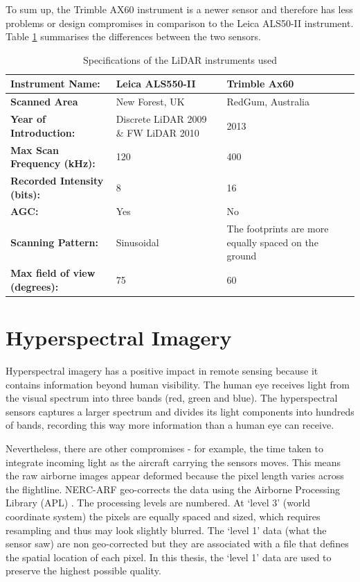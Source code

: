 \documentclass{subfiles}
\begin{document}
	To sum up, the Trimble AX60 instrument is a newer sensor and therefore has less problems or design compromises in comparison to the Leica ALS50-II instrument. Table \ref{tab:InstrumentsSpecs} summarises the differences between the two sensors. 
	
	\begin{table}[!htbp]
		\label{tab:InstrumentsSpecs}%
		\centering
		\begin{tabular}{|l||m{}|m{}|}
			\hline
			\textbf{Instrument Name:}	& \textbf{Leica ALS550-II}     & \textbf{Trimble Ax60  }    \\
			\hline\hline
			\textbf{Scanned Area} & New Forest, UK & RedGum, Australia \\
			\hline
			\textbf{Year of Introduction: }&Discrete LiDAR 2009 \& FW LiDAR 2010& 2013  \\
			\hline
			\textbf{Max Scan Frequency (kHz):} & 120 & 400  \\
			\hline
			\textbf{Recorded Intensity (bits):} & 8 & 16 \\
			\hline
			\textbf{AGC:} & Yes & No \\
			\hline
			\textbf{Scanning Pattern:} & Sinusoidal  & The footprints are more equally spaced on the ground \\			
			\hline
			\textbf{Max field of view (degrees):} & 75 & 60	\\
			\hline
		\end{tabular}%
		\caption{Specifications of the LiDAR instruments used}
	\end{table}
	


	\section{Hyperspectral Imagery}\label{sec:HyperspectralImages}
	\par Hyperspectral imagery has a positive impact in remote sensing because it contains information beyond human visibility. The human eye receives light from the visual spectrum into three bands (red, green and blue). The hyperspectral sensors captures a larger spectrum and divides its light components into hundreds of bands, recording this way more information than a human eye can receive\cite{Smith2012}. 
	
	\par Nevertheless, there are other compromises - for example, the time taken to integrate incoming light as the aircraft carrying the sensors moves.  This means the raw airborne images appear deformed because the pixel length varies across the flightline. NERC-ARF geo-corrects the data using the Airborne Processing Library (APL) \cite{Warren2014}. The processing levels are numbered. At `level 3' (world coordinate system) the pixels are equally spaced and sized, which requires resampling and thus may look slightly blurred. The `level 1' data (what the sensor saw) are non geo-corrected but they are associated with a file that defines the spatial location of each pixel.  In this thesis, the `level 1' data are used to preserve the highest possible quality.
\end{document}
